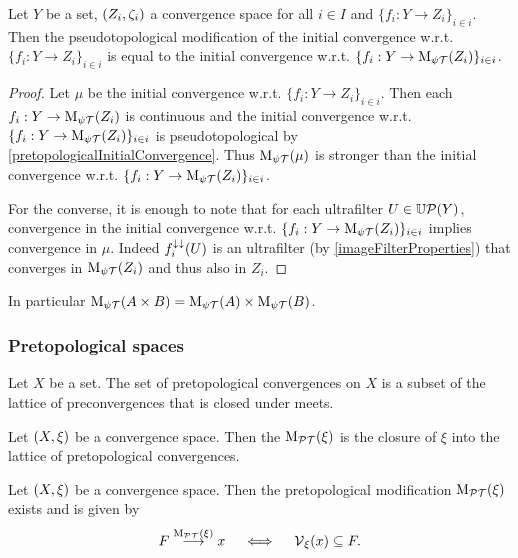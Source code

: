 \begin{proposition} \label{pseudotopologiserCommutesWithInitialStructure}
Let $Y$ be a set, $\left( Z_i, \zeta_i \right)$ a convergence space for all $i\in I$ and $\{f_i: Y\to Z_i\}_{i\in i}$. Then the pseudotopological modification of the initial convergence w.r.t. $\{f_i: Y\to Z_i\}_{i\in i}$ is equal to the initial convergence w.r.t. $\{f_i: Y\to \operatorname{M_{\psi\mathcal{T}}}(Z_i)\}_{i\in i}$.
\end{proposition}
\begin{proof}
Let $\mu$ be the initial convergence w.r.t. $\{f_i: Y\to Z_i\}_{i\in i}$. Then each $f_i: Y\to \operatorname{M_{\psi\mathcal{T}}}(Z_i)$ is continuous and the initial convergence w.r.t. $\{f_i: Y\to \operatorname{M_{\psi\mathcal{T}}}(Z_i)\}_{i\in i}$ is pseudotopological by \ref{pretopologicalInitialConvergence}. Thus $\operatorname{M_{\psi\mathcal{T}}}(\mu)$ is stronger than the initial convergence w.r.t. $\{f_i: Y\to \operatorname{M_{\psi\mathcal{T}}}(Z_i)\}_{i\in i}$.

For the converse, it is enough to note that for each ultrafilter $U\in \operatorname{\mathbb{U}\mathcal{P}}(Y)$, convergence in the initial convergence w.r.t. $\{f_i: Y\to \operatorname{M_{\psi\mathcal{T}}}(Z_i)\}_{i\in i}$ implies convergence in $\mu$. Indeed $f_i^{\downarrow\downarrow}(U)$ is an ultrafilter (by \ref{imageFilterProperties}) that converges in $\operatorname{M_{\psi\mathcal{T}}}(Z_i)$ and thus also in $Z_i$.
\end{proof}
In particular $\operatorname{M_{\psi\mathcal{T}}}(A\times B) = \operatorname{M_{\psi\mathcal{T}}}(A)\times \operatorname{M_{\psi\mathcal{T}}}(B)$.

\subsubsection{Pretopological spaces}
\begin{lemma}
Let $X$ be a set. The set of pretopological convergences on $X$ is a subset of the lattice of preconvergences that is closed under meets.
\end{lemma}
\begin{definition}
Let $\left( X,\xi \right)$ be a convergence space. Then the  $\operatorname{M_\mathcal{PT}}(\xi)$ is the closure of $\xi$ into the lattice of pretopological convergences.
\end{definition}

\begin{proposition} \label{pretopologicalModification}
Let $\left( X,\xi \right)$ be a convergence space. Then the pretopological modification $\operatorname{M_\mathcal{PT}}(\xi)$ exists and is given by
\[ F \overset{\operatorname{M_\mathcal{PT}}(\xi)}{\longrightarrow} x \quad\iff\quad \operatorname{\mathcal{V}}_\xi(x) \subseteq F. \]
\end{proposition}

